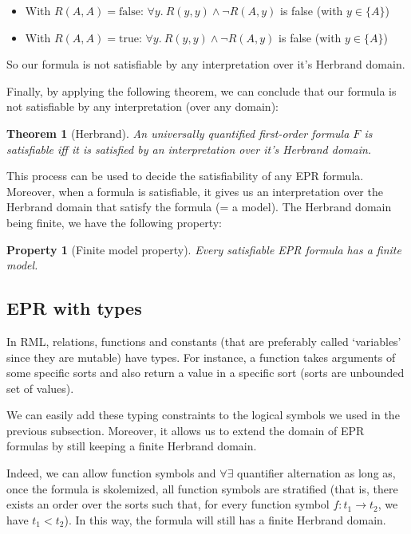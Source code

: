 \documentclass[11pt,a4paper,oldfontcommands]{memoir}
\newtheorem*{theorem}{Theorem}
\newtheorem*{property}{Property}
\begin{document}
        \begin{itemize}
            \item With \(R(A,A)=\text{false}\): \(\forall y. \ R(y,y) \land \neg R(A,y)\) is false (with \( y \in \{A\} \))
            \item With \(R(A,A)=\text{true}\): \(\forall y. \ R(y,y) \land \neg R(A,y)\) is false (with \( y \in \{A\} \))
        \end{itemize}

        So our formula is not satisfiable by any interpretation over it's Herbrand domain.

        Finally, by applying the following theorem, we can conclude that our formula is not satisfiable by any interpretation (over any domain):
        \begin{theorem}[Herbrand]
            An universally quantified first-order formula \(F\) is satisfiable iff it is satisfied by an interpretation over it's Herbrand domain.
        \end{theorem}

        This process can be used to decide the satisfiability of any EPR formula. Moreover, when a formula is satisfiable,
        it gives us an interpretation over the Herbrand domain that satisfy the formula (= a model).
        The Herbrand domain being finite, we have the following property:

        \begin{property}[Finite model property]
            Every satisfiable EPR formula has a finite model.
        \end{property}

        \subsection{EPR with types}

        In RML, relations, functions and constants (that are preferably called `variables' since they are mutable) have types.
        For instance, a function takes arguments of some specific sorts and also return a value in a specific sort (sorts are unbounded set of values).

        We can easily add these typing constraints to the logical symbols we used in the previous subsection.
        Moreover, it allows us to extend the domain of EPR formulas by still keeping a finite Herbrand domain.

        Indeed, we can allow function symbols and \(\forall\exists\) quantifier alternation as long as,
        once the formula is skolemized, all function symbols are stratified (that is, there exists
        an order over the sorts such that, for every function symbol \( f: t_1 \to t_2 \), we have \( t_1 < t_2 \)).
        In this way, the formula will still has a finite Herbrand domain.
\end{document}
